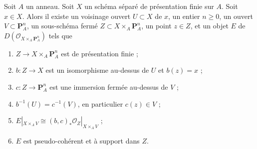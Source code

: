 \begin{lemma}
\label{lemma-derived-chow}
Soit $A$ un anneau. Soit $X$ un schéma séparé de présentation finie
sur $A$. Soit $x \in X$. Alors il existe
un voisinage ouvert $U \subset X$ de $x$,
un entier $n \geq 0$,
un ouvert $V \subset \mathbf{P}^n_A$,
un sous-schéma fermé $Z \subset X \times_A \mathbf{P}^n_A$,
un point $z \in Z$, et
un objet $E$ de $D(\mathcal{O}_{X \times_A \mathbf{P}^n_A})$ tels que
\begin{enumerate}
\item $Z \to X \times_A \mathbf{P}^n_A$ est de présentation finie ;
\item $b : Z \to X$ est un isomorphisme au-dessus de $U$ et $b(z) = x$ ;
\item $c : Z \to \mathbf{P}^n_A$ est une immersion fermée au-dessus de $V$ ;
\item $b^{-1}(U) = c^{-1}(V)$, en particulier $c(z) \in V$ ;
\item $E|_{X \times_A V} \cong
(b, c)_*\mathcal{O}_Z|_{X \times_A V}$ ;
\item $E$ est pseudo-cohérent et à support dans $Z$.
\end{enumerate}
\end{lemma}

